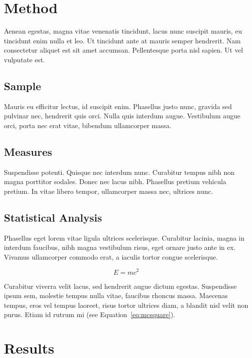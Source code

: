 \documentclass[a4paper,12pt,stu,donotrepeattitle,floatsintext,twoside]{apa7}
\begin{document}
\section{Method}\label{sec:Method}

Aenean egestas, magna vitae venenatis tincidunt, lacus nunc suscipit mauris, eu tincidunt enim nulla et leo. Ut tincidunt ante at mauris semper hendrerit. Nam consectetur aliquet est sit amet accumsan. Pellentesque porta nisl sapien. Ut vel vulputate est.

\subsection{Sample}

Mauris eu efficitur lectus, id suscipit enim. Phasellus justo nunc, gravida sed pulvinar nec, hendrerit quis orci. Nulla quis interdum augue. Vestibulum augue orci, porta nec erat vitae, bibendum ullamcorper massa.

\subsection{Measures}

Suspendisse potenti. Quisque nec interdum nunc. Curabitur tempus nibh non magna porttitor sodales. Donec nec lacus nibh. Phasellus pretium vehicula pretium. In vitae libero tempor, ullamcorper massa nec, ultrices nunc.

\subsection{Statistical Analysis}

Phasellus eget lorem vitae ligula ultrices scelerisque. Curabitur lacinia, magna in interdum faucibus, nibh magna vestibulum risus, eget ornare justo ante in ex. Vivamus ullamcorper commodo erat, a iaculis tortor congue scelerisque.

\begin{equation}\label{eq:mcsquare}
    E=mc^2
\end{equation}

Curabitur viverra velit lacus, sed hendrerit augue dictum egestas. Suspendisse ipsum sem, molestie tempus nulla vitae, faucibus rhoncus massa. Maecenas tempus, eros vel tempus laoreet, risus tortor ultrices diam, a blandit nisl velit non purus. Etiam id rutrum mi (see Equation~\ref{eq:mcsquare}).

\section{Results}
\label{sec:4}
\end{document}
